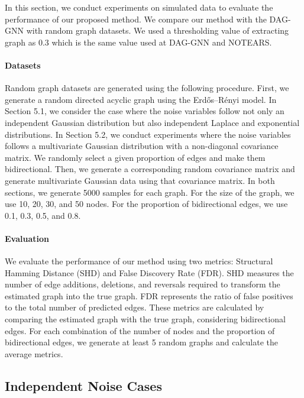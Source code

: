 \documentclass[10pt]{article}
\begin{document}
In this section, we conduct experiments on simulated data to evaluate the performance of our proposed method. We compare our method with the DAG-GNN \cite{yu2019daggnn} with random graph datasets. We used a thresholding value of extracting graph as 0.3 which is the same value used at DAG-GNN and NOTEARS.\\ 

\paragraph*{Datasets} Random graph datasets are generated using the following procedure. First, we generate a random directed acyclic graph using the Erdős–Rényi model. In Section 5.1, we consider the case where the noise variables follow not only an independent Gaussian distribution but also independent Laplace and exponential distributions. In Section 5.2, we conduct experiments where the noise variables follows a multivariate Gaussian distribution with a non-diagonal covariance matrix. We randomly select a given proportion of edges and make them bidirectional. Then, we generate a corresponding random covariance matrix and generate multivariate Gaussian data using that covariance matrix. In both sections, we generate 5000 samples for each graph. For the size of the graph, we use 10, 20, 30, and 50 nodes. For the proportion of bidirectional edges, we use 0.1, 0.3, 0.5, and 0.8. \\

\paragraph*{Evaluation} We evaluate the performance of our method using two metrics: Structural Hamming Distance (SHD) and False Discovery Rate (FDR). SHD measures the number of edge additions, deletions, and reversals required to transform the estimated graph into the true graph. FDR represents the ratio of false positives to the total number of predicted edges. These metrics are calculated by comparing the estimated graph with the true graph, considering bidirectional edges. For each combination of the number of nodes and the proportion of bidirectional edges, we generate at least 5 random graphs and calculate the average metrics.

\subsection{Independent Noise Cases}
\end{document}
